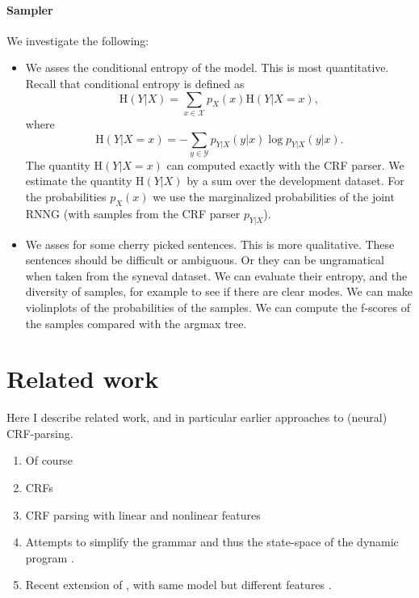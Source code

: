 \paragraph{Sampler} We investigate the following:
\begin{itemize}
  \item We asses the conditional entropy of the model. This is most quantitative. Recall that conditional entropy is defined as
  \begin{equation}
    \text{H}(Y|X) = \sum_{x \in \mathcal{X}} p_X(x)\text{H}(Y|X = x),
  \end{equation}
  where
  \begin{equation}
    \text{H}(Y|X = x) = - \sum_{y \in \mathcal{Y}} p_{Y|X}(y|x) \log p_{Y|X}(y|x).
  \end{equation}
  The quantity $\text{H}(Y|X = x)$ can computed exactly with the CRF parser. We estimate the quantity $\text{H}(Y|X)$ by a sum over the development dataset. For the probabilities $p_X(x)$ we use the marginalized probabilities of the joint RNNG (with samples from the CRF parser $p_{Y|X}$).
  \item We asses for some cherry picked sentences. This is more qualitative. These sentences should be difficult or ambiguous. Or they can be ungramatical when taken from the syneval dataset. We can evaluate their entropy, and the diversity of samples, for example to see if there are clear modes. We can make violinplots of the probabilities of the samples. We can compute the f-scores of the samples compared with the argmax tree.
\end{itemize}

\section{Related work}
Here I describe related work, and in particular earlier approaches to (neural) CRF-parsing.
\begin{enumerate}
  \item Of course \citep{stern2017minimal}
  \item CRFs \citep{sutton2012crf}
  \item CRF parsing with linear and nonlinear features \citep{finkel2008crf,klein2015crf}
  \item Attempts to simplify the grammar and thus the state-space of the dynamic program \citep{hall2014less}.
  \item Recent extension of \citet{stern2017minimal}, with same model but different features \citep{kitaev2018attentive}.
\end{enumerate}

